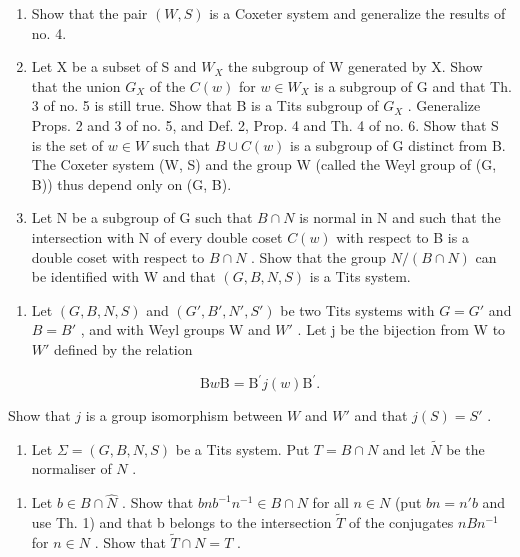 \begin{enumerate}
\def\labelenumi{\alph{enumi})}
\setcounter{enumi}{5}
\item
  Show that the pair \((W,S)\) is a Coxeter system and generalize the results of no. 4.
\item
  Let X be a subset of S and \(W_{X}\) the subgroup of W generated by X. Show that the union \(G_{X}\) of the \(C(w)\) for \(w \in W_{X}\) is a subgroup of G and that Th. 3 of no. 5 is still true. Show that B is a Tits subgroup of \(G_{X}\) . Generalize Props. 2 and 3 of no. 5, and Def. 2, Prop. 4 and Th. 4 of no. 6. Show that S is the set of \(w \in W\) such that \(B \cup C(w)\) is a subgroup of G distinct from B. The Coxeter system (W, S) and the group W (called the Weyl group of (G, B)) thus depend only on (G, B).
\item
  Let N be a subgroup of G such that \(B \cap N\) is normal in N and such that the intersection with N of every double coset \(C(w)\) with respect to B is a double coset with respect to \(B \cap N\) . Show that the group \(N/(B \cap N)\) can be identified with W and that \((G, B, N, S)\) is a Tits system.
\end{enumerate}

\begin{enumerate}
\def\labelenumi{\arabic{enumi})}
\setcounter{enumi}{3}
\tightlist
\item
  Let \((G, B, N, S)\) and \((G', B', N', S')\) be two Tits systems with \(G = G'\) and \(B = B'\) , and with Weyl groups W and \(W'\) . Let j be the bijection from W to \(W'\) defined by the relation
\end{enumerate}

\[
\mathrm{B} w \mathrm{B} = \mathrm{B} ^ {\prime} j (w) \mathrm{B} ^ {\prime}.
\]

Show that \(j\) is a group isomorphism between \(W\) and \(W'\) and that \(j(S) = S'\) .

\begin{enumerate}
\def\labelenumi{\arabic{enumi})}
\setcounter{enumi}{4}
\tightlist
\item
  Let \(\Sigma = (G, B, N, S)\) be a Tits system. Put \(T = B \cap N\) and let \(\tilde{N}\) be the normaliser of \(N\) .
\end{enumerate}

\begin{enumerate}
\def\labelenumi{\alph{enumi})}
\tightlist
\item
  Let \(b \in B \cap \hat{N}\) . Show that \(bnb^{-1}n^{-1} \in B \cap N\) for all \(n \in N\) (put \(bn = n'b\) and use Th. 1) and that b belongs to the intersection \(\tilde{T}\) of the conjugates \(nBn^{-1}\) for \(n \in N\) . Show that \(\tilde{T} \cap N = T\) .
\end{enumerate}

